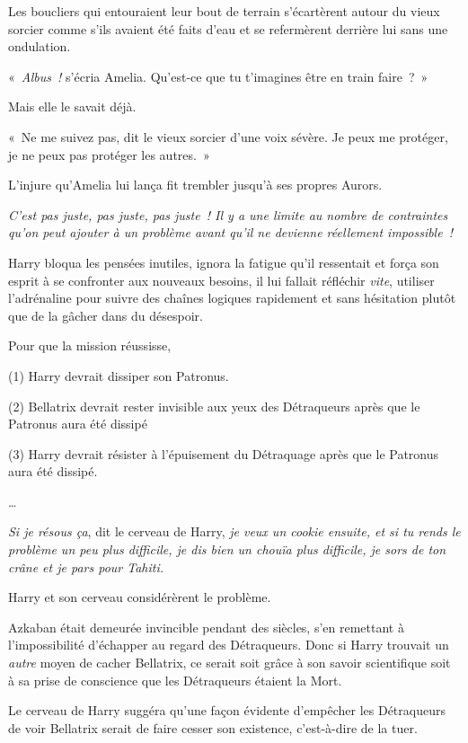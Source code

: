 Les boucliers qui entouraient leur bout de terrain s'écartèrent autour du vieux sorcier comme s'ils avaient été faits d'eau et se refermèrent derrière lui sans une ondulation.

«~\emph{Albus~!} s'écria Amelia. Qu'est-ce que tu t'imagines être en train faire~?~»

Mais elle le savait déjà.

«~Ne me suivez pas, dit le vieux sorcier d'une voix sévère. Je peux me protéger, je ne peux pas protéger les autres.~»

L'injure qu'Amelia lui lança fit trembler jusqu'à ses propres Aurors.

\later

\emph{C'est pas juste, pas juste, pas juste~! Il y a une limite au nombre de contraintes qu'on peut ajouter à un problème avant qu'il ne devienne réellement impossible~!}

Harry bloqua les pensées inutiles, ignora la fatigue qu'il ressentait et força son esprit à se confronter aux nouveaux besoins, il lui fallait réfléchir \emph{vite}, utiliser l'adrénaline pour suivre des chaînes logiques rapidement et sans hésitation plutôt que de la gâcher dans du désespoir.

Pour que la mission réussisse,

(1) Harry devrait dissiper son Patronus.

(2) Bellatrix devrait rester invisible aux yeux des Détraqueurs après que le Patronus aura été dissipé

(3) Harry devrait résister à l'épuisement du Détraquage après que le Patronus aura été dissipé.

…

\emph{Si je résous ça}, dit le cerveau de Harry, \emph{je veux un cookie ensuite, et si tu rends le problème un peu plus difficile, je dis bien un chouïa plus difficile, je sors de ton crâne et je pars pour Tahiti.}

Harry et son cerveau considérèrent le problème.

Azkaban était demeurée invincible pendant des siècles, s'en remettant à l'impossibilité d'échapper au regard des Détraqueurs. Donc si Harry trouvait un \emph{autre} moyen de cacher Bellatrix, ce serait soit grâce à son savoir scientifique soit à sa prise de conscience que les Détraqueurs étaient la Mort.

Le cerveau de Harry suggéra qu'une façon évidente d'empêcher les Détraqueurs de voir Bellatrix serait de faire cesser son existence, c'est-à-dire de la tuer.

